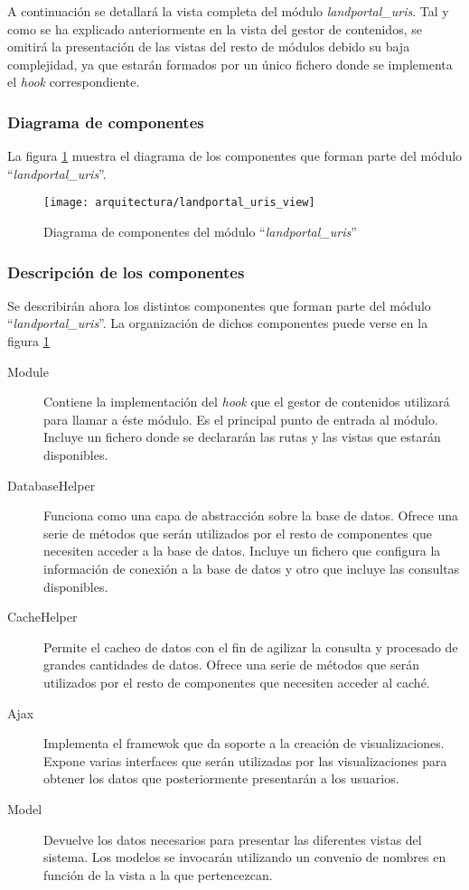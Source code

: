 A continuación se detallará la vista completa del módulo \textit{landportal\_uris}.  Tal y como se ha explicado anteriormente en la vista del gestor de contenidos, se omitirá la presentación de las vistas del resto de módulos debido su baja complejidad, ya que estarán formados por un único fichero donde se implementa el \textit{hook} correspondiente.

\subsubsection{Diagrama de componentes}
La figura \ref{fig:diagrama_componentes_landportal_uris} muestra el diagrama de los componentes que forman parte del módulo ``\textit{landportal\_uris}''.
\begin{landscape}
	\begin{figure}[ht]
		\centering
		\texttt{[image: arquitectura/landportal\_uris\_view]}
		\caption{Diagrama de componentes del módulo ``\textit{landportal\_uris}''}
		\label{fig:diagrama_componentes_landportal_uris}
	\end{figure}
\end{landscape}


\subsubsection{Descripción de los componentes}
Se describirán ahora los distintos componentes que forman parte del módulo ``\textit{landportal\_uris}''.  La organización de dichos componentes puede verse en la figura \ref{fig:diagrama_componentes_landportal_uris}
\begin{description}
	\item[Module]  Contiene la implementación del \textit{hook} que el gestor de contenidos utilizará para llamar a éste módulo.  Es el principal punto de entrada al módulo.  Incluye un fichero donde se declararán las rutas y las vistas que estarán disponibles.
	\item[DatabaseHelper]  Funciona como una capa de abstracción sobre la base de datos.  Ofrece una serie de métodos que serán utilizados por el resto de componentes que necesiten acceder a la base de datos.  Incluye un fichero que configura la información de conexión a la base de datos y otro que incluye las consultas disponibles.
	\item[CacheHelper]  Permite el cacheo de datos con el fin de agilizar la consulta y procesado de grandes cantidades de datos.  Ofrece una serie de métodos que serán utilizados por el resto de componentes que necesiten acceder al caché.
	\item[Ajax]  Implementa el framewok que da soporte a la creación de visualizaciones.  Expone varias interfaces que serán utilizadas por las visualizaciones para obtener los datos que posteriormente presentarán a los usuarios.
	\item[Model]  Devuelve los datos necesarios para presentar las diferentes vistas del sistema.  Los modelos se invocarán utilizando un convenio de nombres en función de la vista a la que pertencezcan.
\end{description}

